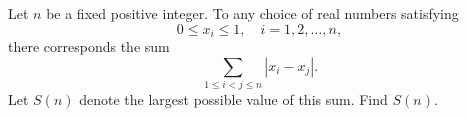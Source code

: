 Let $n$ be a fixed positive integer. To any choice of real numbers satisfying \[0\le x_{i}\le 1,\quad i=1,2,\ldots, n,\] there corresponds the sum \[\sum_{1\le i<j\le n}|x_{i}-x_{j}|.\] Let $S(n)$ denote the largest possible value of this sum. Find $S(n)$.